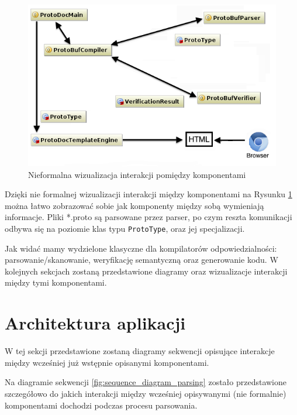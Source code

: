 \documentclass[pdflatex,11pt]{aghdpl}
\begin{document}
\begin{figure}[ch!]
\begin{center}
 \includegraphics[scale=0.85]{main_classes.png}
\end{center}
\caption{Nieformalna wizualizacja interakcji pomiędzy komponentami}
\label{simple_visualization}
\end{figure}

Dzięki nie formalnej wizualizacji interakcji między komponentami na Rysunku \ref{simple_visualization} można łatwo zobrazować sobie
jak komponenty między sobą wymieniają informacje. Pliki *.proto są parsowane przez parser, po czym reszta komunikacji odbywa się na poziomie 
klas typu \verb|ProtoType|, oraz jej specjalizacji.

Jak widać mamy wydzielone klasyczne dla kompilatorów odpowiedzialności: parsowanie/skanowanie, weryfikację semantyczną oraz generowanie kodu.
W kolejnych sekcjach zostaną przedstawione diagramy oraz wizualizacje interakcji między tymi komponentami.

\newpage
\section{Architektura aplikacji}
\label{sec:sequence_diagrams}

W tej sekcji przedstawione zostaną diagramy sekwencji opisujące interakcje między wcześniej już wstępnie opisanymi komponentami.



Na diagramie sekwencji \ref{fig:sequence_diagram_parsing} zostało przedstawione szczegółowo do jakich interakcji między wcześniej opisywanymi (nie formalnie)
komponentami dochodzi podczas procesu parsowania. 
\end{document}
